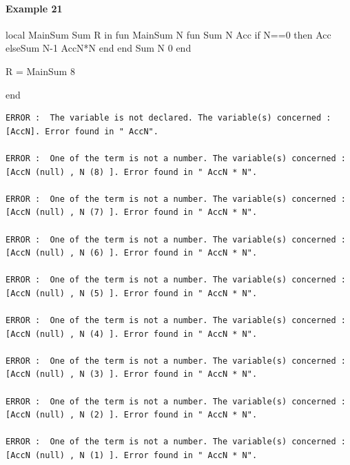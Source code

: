 \documentclass[11pt,a4paper,twoside,openright]{report}
\begin{document}
\paragraph{Example 21}
\begin{OZ}
local MainSum Sum R in
	fun {MainSum N}
		fun {Sum N Acc}
			if N==0 then Acc 
			else{Sum N-1 AccN*N}
			end
		end
    {Sum N 0}
	end

	R = {MainSum 8}

end

\end{OZ}


\begin{lstlisting}
ERROR :  The variable is not declared. The variable(s) concerned :[AccN]. Error found in " AccN".

ERROR :  One of the term is not a number. The variable(s) concerned :[AccN (null) , N (8) ]. Error found in " AccN * N".

ERROR :  One of the term is not a number. The variable(s) concerned :[AccN (null) , N (7) ]. Error found in " AccN * N".

ERROR :  One of the term is not a number. The variable(s) concerned :[AccN (null) , N (6) ]. Error found in " AccN * N".

ERROR :  One of the term is not a number. The variable(s) concerned :[AccN (null) , N (5) ]. Error found in " AccN * N".

ERROR :  One of the term is not a number. The variable(s) concerned :[AccN (null) , N (4) ]. Error found in " AccN * N".

ERROR :  One of the term is not a number. The variable(s) concerned :[AccN (null) , N (3) ]. Error found in " AccN * N".

ERROR :  One of the term is not a number. The variable(s) concerned :[AccN (null) , N (2) ]. Error found in " AccN * N".

ERROR :  One of the term is not a number. The variable(s) concerned :[AccN (null) , N (1) ]. Error found in " AccN * N".
\end{lstlisting}

%
%
%
%
%
\end{document}
